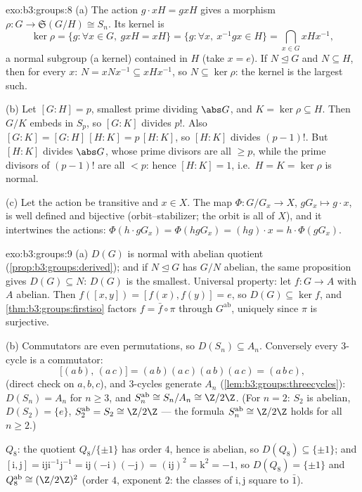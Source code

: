 \begin{solution}{exo:b3:groups:8}
(a) The action $g \cdot xH = gxH$ gives a morphism $\rho \colon G
\to \mathfrak S(G/H) \cong S_n$. Its kernel is
\[
\ker\rho = \{g : \forall x \in G,\ gxH = xH\}
= \{g : \forall x,\ x^{-1}gx \in H\}
= \bigcap_{x \in G} xHx^{-1},
\]
a normal subgroup (a kernel) contained in $H$ (take $x = e$). If
$N \trianglelefteq G$ and $N \subseteq H$, then for every $x$: $N
= xNx^{-1} \subseteq xHx^{-1}$, so $N \subseteq \ker\rho$: the
kernel is the largest such.

(b) Let $[G:H] = p$, smallest prime dividing $\abs G$, and $K =
\ker\rho \subseteq H$. Then $G/K$ embeds in $S_p$, so $[G:K]$
divides $p!$. Also $[G:K] = [G:H]\,[H:K] = p\,[H:K]$, so $[H:K]$
divides $(p-1)!$. But $[H:K]$ divides $\abs G$, whose prime
divisors are all $\geq p$, while the prime divisors of $(p-1)!$
are all $< p$: hence $[H:K] = 1$, i.e.\ $H = K = \ker \rho$ is
normal.

(c) Let the action be transitive and $x \in X$. The map $\Phi
\colon G/G_x \to X$, $gG_x \mapsto g \cdot x$, is well defined and
bijective (orbit--stabilizer; the orbit is all of $X$), and it
intertwines the actions: $\Phi(h \cdot gG_x) = \Phi(hgG_x) = (hg)
\cdot x = h \cdot \Phi(gG_x)$.
\end{solution}

\begin{solution}{exo:b3:groups:9}
(a) $D(G)$ is normal with abelian quotient
(\cref{prop:b3:groups:derived}); and if $N \trianglelefteq G$ has
$G/N$ abelian, the same proposition gives $D(G) \subseteq N$:
$D(G)$ is the smallest. Universal property: let $f \colon G \to A$
with $A$ abelian. Then $f([x,y]) = [f(x), f(y)] = e$, so $D(G)
\subseteq \ker f$, and \cref{thm:b3:groups:firstiso} factors $f =
\bar f \circ \pi$ through $G^{\mathrm{ab}}$, uniquely since $\pi$
is surjective.

(b) Commutators are even permutations, so $D(S_n) \subseteq A_n$.
Conversely every $3$-cycle is a commutator:
\[
\bigl[(a\,b),\,(a\,c)\bigr] = (a\,b)(a\,c)(a\,b)(a\,c) =
(a\,b\,c),
\]
(direct check on $a, b, c$), and $3$-cycles generate $A_n$
(\cref{lem:b3:groups:threecycles}): $D(S_n) = A_n$ for $n \geq 3$,
and $S_n^{\mathrm{ab}} \cong S_n/A_n \cong \Z/2\Z$. (For $n = 2$:
$S_2$ is abelian, $D(S_2) = \{e\}$, $S_2^{\mathrm{ab}} = S_2
\cong \Z/2\Z$ --- the formula $S_n^{\mathrm{ab}} \cong \Z/2\Z$
holds for all $n \geq 2$.)

$Q_8$: the quotient $Q_8/\{\pm 1\}$ has order $4$, hence is
abelian, so $D(Q_8) \subseteq \{\pm 1\}$; and $[\mathrm i, \mathrm
j] = \mathrm i \mathrm j \mathrm i^{-1}\mathrm j^{-1} = \mathrm
i\mathrm j(-\mathrm i)(-\mathrm j) = (\mathrm i \mathrm j)^2 =
\mathrm k^2 = -1$, so $D(Q_8) = \{\pm 1\}$ and
$Q_8^{\mathrm{ab}} \cong (\Z/2\Z)^2$ (order $4$, exponent $2$:
the classes of $\mathrm i, \mathrm j$ square to $\bar 1$).
\end{solution}

